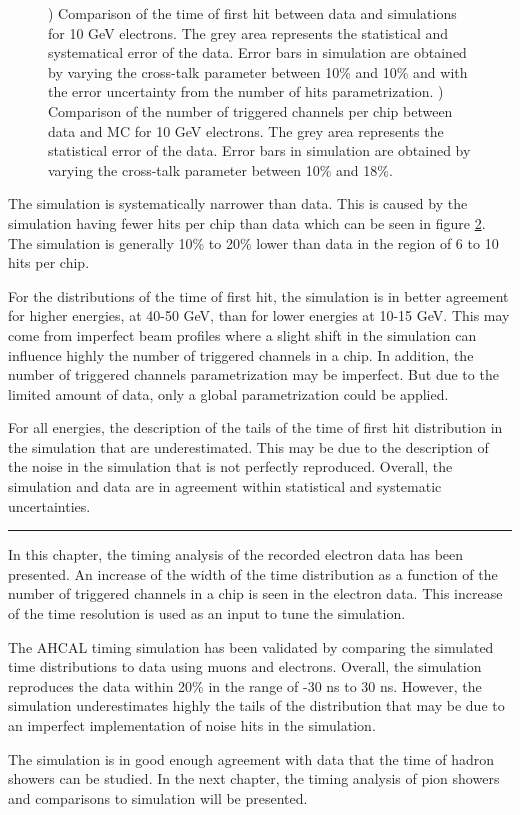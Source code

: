 \begin{figure}[htbp!]
\begin{subfigure}[t]{0.49\textwidth}
		\caption{}\label{fig:elec_sim_data_nHits_10GeV}
	\end{subfigure}
	\caption{) Comparison of the time of first hit between data and simulations for 10 GeV electrons. The grey area represents the statistical and systematical error of the data. Error bars in simulation are obtained by varying the cross-talk parameter between 10\% and 10\% and with the error uncertainty from the number of hits parametrization. ) Comparison of the number of triggered channels per chip between data and MC for 10 GeV electrons. The grey area represents the statistical error of the data. Error bars in simulation are obtained by varying the cross-talk parameter between 10\% and 18\%.}
\end{figure}

The simulation is systematically narrower than data. This is caused by the simulation having fewer hits per chip than data which can be seen in figure \ref{fig:elec_sim_data_nHits_10GeV}. The simulation is generally 10\% to 20\% lower than data in the region of 6 to 10 hits per chip.

For the distributions of the time of first hit, the simulation is in better agreement for higher energies, at 40-50 GeV, than for lower energies at 10-15 GeV. This may come from imperfect beam profiles where a slight shift in the simulation can influence highly the number of triggered channels in a chip. In addition, the number of triggered channels parametrization may be imperfect. But due to the limited amount of data, only a global parametrization could be applied.

For all energies, the description of the tails of the time of first hit distribution in the simulation that are underestimated. This may be due to the description of the noise in the simulation that is not perfectly reproduced. Overall, the simulation and data are in agreement within statistical and systematic uncertainties.

\begin{center}
  \rule{0.5\textwidth}{.4pt}
\end{center}

In this chapter, the timing analysis of the recorded electron data has been presented. An increase of the width of the time distribution as a function of the number of triggered channels in a chip is seen in the electron data. This increase of the time resolution is used as an input to tune the simulation.

The AHCAL timing simulation has been validated by comparing the simulated time distributions to data using muons and electrons. Overall, the simulation reproduces the data within 20\% in the range of -30 ns to 30 ns. However, the simulation underestimates highly the tails of the distribution that may be due to an imperfect implementation of noise hits in the simulation.

The simulation is in good enough agreement with data that the time of hadron showers can be studied. In the next chapter, the timing analysis of pion showers and comparisons to simulation will be presented.
